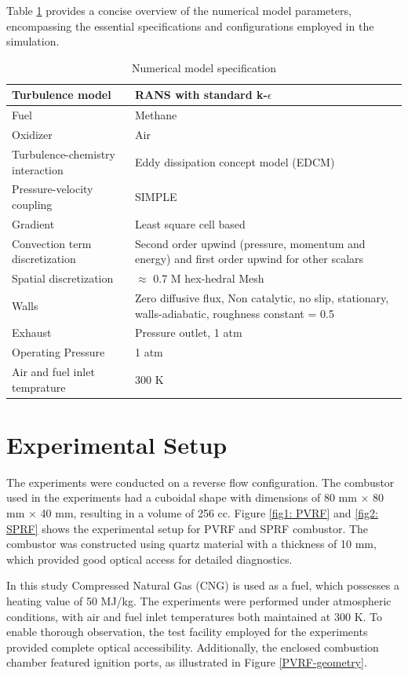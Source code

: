 Table \ref{Numerical Model} provides a concise overview of the numerical model parameters, encompassing the essential specifications and configurations employed in the simulation.

\begin{table}[h!]
\centering
\caption{Numerical model specification}
\begin{tabular}{|l| m{8cm}| }
\hline
\textbf{Turbulence model} & \textbf{RANS with standard k-$\epsilon$}  \\ 
\hline
Fuel & Methane \\
\hline
Oxidizer & Air \\
\hline
Turbulence-chemistry interaction & Eddy dissipation concept model (EDCM) \\
\hline
Pressure-velocity coupling & SIMPLE \\
\hline
Gradient & Least square cell based\\
\hline
Convection term discretization & Second order upwind (pressure, momentum and energy) and first order upwind for other scalars\\
\hline
Spatial discretization & $\approx$ 0.7 M hex-hedral Mesh\\
\hline
Walls & Zero diffusive flux, Non catalytic, no slip, stationary, walls-adiabatic, roughness constant = 0.5 \\
\hline
Exhaust & Pressure outlet, 1 atm\\
\hline
Operating Pressure & 1 atm\\
\hline
Air and fuel inlet temprature & 300 K\\
\hline
\end{tabular}
\label{Numerical Model}
\end{table}

\section{Experimental Setup}
The experiments were conducted on a reverse flow configuration. The combustor used in the experiments had a cuboidal shape with dimensions of 80 mm $\times$ 80 mm $\times$ 40 mm, resulting in a volume of 256 cc. Figure \ref{fig1: PVRF} and \ref{fig2: SPRF} shows the experimental setup for PVRF and SPRF combustor. The combustor was constructed using quartz material with a thickness of 10 mm, which provided good optical access for detailed diagnostics.

In this study Compressed Natural Gas (CNG) is used as a fuel, which possesses a heating value of 50 MJ/kg. The experiments were performed under atmospheric conditions, with air and fuel inlet temperatures both maintained at 300 K. To enable thorough observation, the test facility employed for the experiments provided complete optical accessibility. Additionally, the enclosed combustion chamber featured ignition ports, as illustrated in Figure \ref{PVRF-geometry}.

